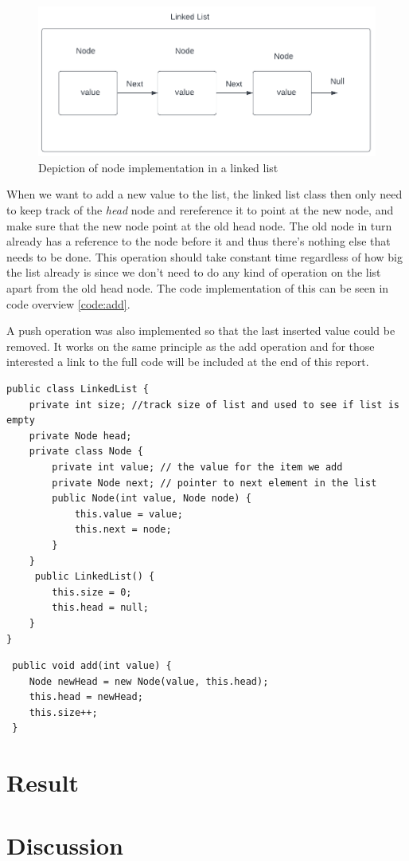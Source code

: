 \documentclass[a4paper,11pt]{article}
\newenvironment{code}{\captionsetup{type=listing}}{}
\begin{document}
\begin{figure}[h]
    \centering
    \includegraphics[width=\textwidth]{linkedListDiagram.pdf}
    \caption{Depiction of node implementation in a linked list}
    \label{fig:linkedListDiagram}
\end{figure}
When we want to add a new value to the list, the linked list class then only need to keep track of the \textit{head} 
node and rereference it to point at the new node, and make sure that the new node point at the old head node. 
The old node in turn already has a reference to the node before it and thus there's nothing else that needs 
to be done. This operation should take constant time regardless of how big the list already is since we don't 
need to do any kind of operation on the list apart from the old head node. The code implementation of this can be seen
in code overview \ref{code:add}.

A push operation was also implemented so that the last inserted value could be removed. It works on the same principle as
the add operation and for those interested a link to the full code will be included at the end of this report.





\begin{code}
\label{code:classStructure}
\begin{verbatim}
public class LinkedList {
    private int size; //track size of list and used to see if list is empty
    private Node head;
    private class Node {
        private int value; // the value for the item we add
        private Node next; // pointer to next element in the list
        public Node(int value, Node node) {
            this.value = value;
            this.next = node;
        }
    }
     public LinkedList() {
        this.size = 0;
        this.head = null;
    }
}
\end{verbatim}
\end{code}

\begin{code}
\label{code:add}
\begin{verbatim}
 public void add(int value) {
    Node newHead = new Node(value, this.head);
    this.head = newHead;
    this.size++;
 }
\end{verbatim}
\end{code}



\section*{Result}



\section*{Discussion}
\end{document}
